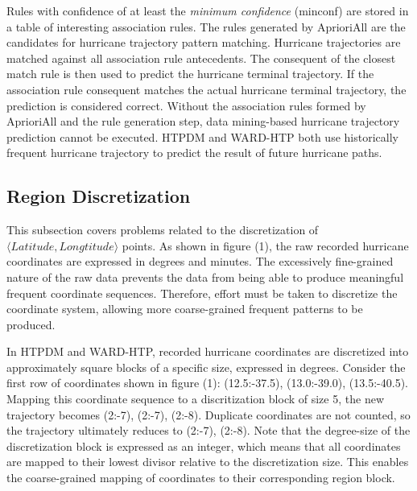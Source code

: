 \documentclass[12pt,conference]{IEEEtran}
\begin{document}
Rules with confidence of at least the \textit{minimum confidence} (minconf) are stored in a table of interesting association rules. The rules generated by AprioriAll are the candidates for hurricane trajectory pattern matching. Hurricane trajectories are matched against all association rule antecedents. The consequent of the closest match rule is then used to predict the hurricane terminal trajectory. If the association rule consequent matches the actual hurricane terminal trajectory, the prediction is considered correct. Without the association rules formed by AprioriAll and the rule generation step, data mining-based hurricane trajectory prediction cannot be executed. HTPDM and WARD-HTP both use historically frequent hurricane trajectory to predict the result of future hurricane paths.

\subsection{Region Discretization}

This subsection covers problems related to the discretization of $\langle Latitude, Longtitude \rangle$ points. As shown in figure (1), the raw recorded hurricane coordinates are expressed in degrees and minutes. The excessively fine-grained nature of the raw data prevents the data from being able to produce meaningful frequent coordinate sequences. Therefore, effort must be taken to discretize the coordinate system, allowing more coarse-grained frequent patterns to be produced.

In HTPDM and WARD-HTP, recorded hurricane coordinates are discretized into approximately square blocks of a specific size, expressed in degrees. Consider the first row of coordinates shown in figure (1): (12.5:-37.5), (13.0:-39.0), (13.5:-40.5). Mapping this coordinate sequence to a discritization block of size 5, the new trajectory becomes (2:-7), (2:-7), (2:-8). Duplicate coordinates are not counted, so the trajectory ultimately reduces to (2:-7), (2:-8). Note that the degree-size of the discretization block is expressed as an integer, which means that all coordinates are mapped to their lowest divisor relative to the discretization size. This enables the coarse-grained mapping of coordinates to their corresponding region block. 
\end{document}
